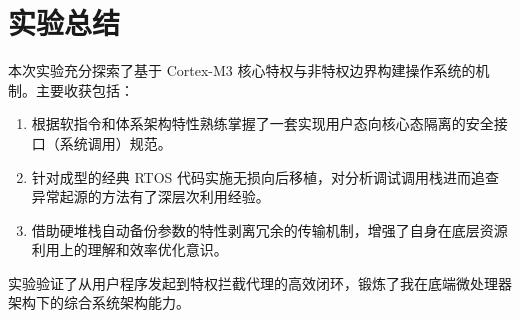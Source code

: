 \documentclass[UTF8]{ctexart}
\begin{document}
\section{实验总结}
本次实验充分探索了基于 Cortex-M3 核心特权与非特权边界构建操作系统的机制。主要收获包括：
\begin{enumerate}
    \item 根据软指令和体系架构特性熟练掌握了一套实现用户态向核心态隔离的安全接口（系统调用）规范。
    \item 针对成型的经典 RTOS 代码实施无损向后移植，对分析调试调用栈进而追查异常起源的方法有了深层次利用经验。
    \item 借助硬堆栈自动备份参数的特性剥离冗余的传输机制，增强了自身在底层资源利用上的理解和效率优化意识。
\end{enumerate}
实验验证了从用户程序发起到特权拦截代理的高效闭环，锻炼了我在底端微处理器架构下的综合系统架构能力。
\end{document}
